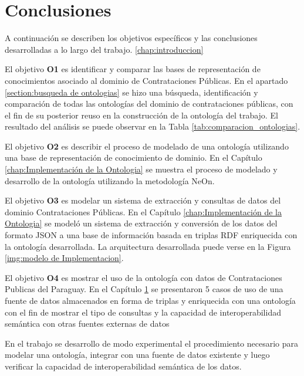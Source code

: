\section{Conclusiones}
\label{chap:analisis}
A continuación se describen los objetivos específicos y las conclusiones desarrolladas a lo largo del trabajo. \ref{chap:introduccion} 

El objetivo \textbf{O1} es identificar y comparar las bases de representación de conocimientos asociado al dominio de Contrataciones Públicas. En el apartado \ref{section:busqueda de ontologias} se hizo una búsqueda, identificación y comparación de todas las ontologías del dominio de contrataciones públicas, con el fin de su posterior reuso en la construcción de la ontología del trabajo. El resultado del análisis se puede observar en la Tabla \ref{tab:comparacion_ontologias}.

El objetivo \textbf{O2} es describir el proceso de modelado de una ontología utilizando una base de representación de conocimiento de dominio. En el Capítulo \ref{chap:Implementación de la Ontologia} se muestra el proceso de modelado y desarrollo de la ontología utilizando la metodología NeOn.

El objetivo \textbf{O3} es modelar un sistema de extracción y consultas de datos del dominio Contrataciones Públicas. En el Capítulo \ref{chap:Implementación de la Ontologia} se modeló un sistema de extracción y conversión de los datos del formato JSON a una base de información basada en triplas RDF enriquecida con la ontología desarrollada. La arquitectura desarrollada puede verse en la Figura \ref{img:modelo de Implementacion}.

El objetivo \textbf{O4} es mostrar el uso de la ontología con datos de Contrataciones Publicas del Paraguay. En el Capítulo \ref{chap:analisis} se presentaron 5 casos de uso de una fuente de datos almacenados en forma de triplas y enriquecida con una ontología con el fin de mostrar el tipo de consultas y la capacidad de interoperabilidad semántica con otras fuentes externas de datos

En el trabajo se desarrollo de modo experimental el procedimiento necesario para modelar una ontología, integrar con una fuente de datos existente y luego verificar la capacidad de interoperabilidad semántica de los datos. 